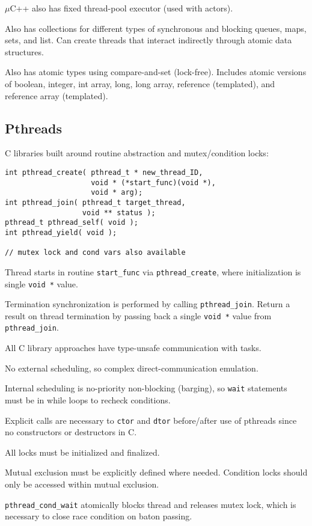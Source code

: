 \documentclass[11pt]{article}
\begin{document}
\(\mu\)C++ also has fixed thread-pool executor (used with actors).

Also has collections for different types of synchronous and blocking queues,
maps, sets, and list.
Can create threads that interact indirectly through atomic data structures.

Also has atomic types using compare-and-set (lock-free).
Includes atomic versions of boolean, integer, int array, long, long array,
reference (templated), and reference array (templated).
\subsection{Pthreads}
\label{sec:org7d2339a}
C libraries built around routine abstraction and mutex/condition locks:
\begin{verbatim}
int pthread_create( pthread_t * new_thread_ID,
                    void * (*start_func)(void *),
                    void * arg);
int pthread_join( pthread_t target_thread,
                  void ** status );
pthread_t pthread_self( void );
int pthread_yield( void );

// mutex lock and cond vars also available
\end{verbatim}

Thread starts in routine \texttt{start\_func} via \texttt{pthread\_create}, where
initialization is single \texttt{void *} value.

Termination synchronization is performed by calling \texttt{pthread\_join}.
Return a result on thread termination by passing back a single
\texttt{void *} value from \texttt{pthread\_join}.

All C library approaches have type-unsafe communication with tasks.

No external scheduling, so complex direct-communication emulation.

Internal scheduling is no-priority non-blocking (barging), so \texttt{wait}
statements must be in while loops to recheck conditions.

Explicit calls are necessary to \texttt{ctor} and \texttt{dtor} before/after use of pthreads
since no constructors or destructors in C.

All locks must be initialized and finalized.

Mutual exclusion must be explicitly defined where needed.
Condition locks should only be accessed within mutual exclusion.

\texttt{pthread\_cond\_wait} atomically blocks thread and releases mutex lock, which is
necessary to close race condition on baton passing.
\end{document}
